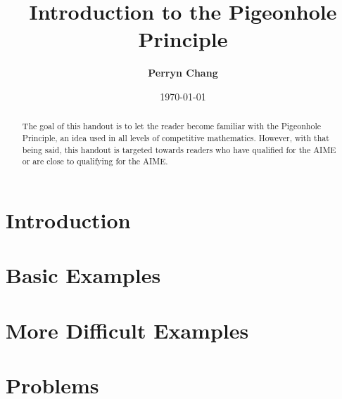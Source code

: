 \documentclass[l1pt]{article}
\title{\textbf{Introduction to the Pigeonhole Principle}}
\author{\textbf{Perryn Chang}}
\date{\today}
\theoremstyle{plain}
\theoremstyle{definition}
\theoremstyle{remark}
\begin{document}
\maketitle

\begin{abstract}
The goal of this handout is to let the reader become familiar with the Pigeonhole Principle, an idea used in all levels of competitive mathematics. However, with that being said, this handout is targeted towards readers who have qualified for the AIME or are close to qualifying for the AIME. 
\end{abstract}

\tableofcontents

\eject

\section{Introduction}

\section{Basic Examples}

\section{More Difficult Examples}

\section{Problems}
\end{document}
